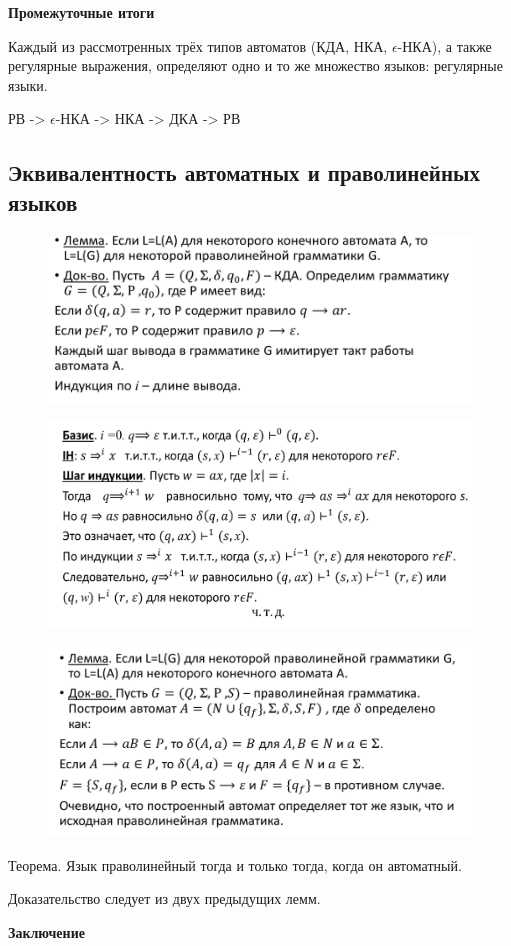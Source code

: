\documentclass{article}
\begin{document}
\textbf{Промежуточные итоги}

Каждый из рассмотренных трёх типов автоматов
(КДА, НКА, $\epsilon$-НКА), а также регулярные
выражения, определяют одно и то же множество
языков: регулярные языки.

РВ -> $\epsilon$-НКА -> НКА -> ДКА -> РВ


\subsection{Эквивалентность автоматных и
праволинейных языков}

\begin{figure}[H]
    \centering
    \includegraphics[width=0.50\linewidth]{Снимок экрана 2025-03-20 091416.png}
\end{figure}

\begin{figure}[H]
    \centering
    \includegraphics[width=0.50\linewidth]{Снимок экрана 2025-03-20 092027.png}
\end{figure}

\begin{figure}[H]
    \centering
    \includegraphics[width=0.50\linewidth]{Снимок экрана 2025-03-20 092811.png}
\end{figure}

Теорема. Язык праволинейный тогда и только тогда, когда
он автоматный.

 Доказательство следует из двух предыдущих лемм.

 \textbf{Заключение}
\end{document}

